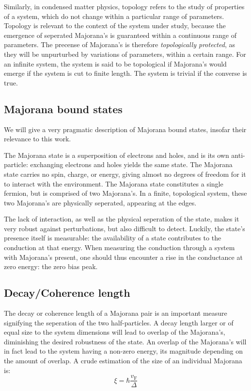 	Similarly, in condensed matter physics, topology refers to the study of properties of a system, which do not change within a particular range of parameters.
	Topology is relevant to the context of the system under study, because the emergence of seperated Majorana's is guaranteed within a continuous range of parameters.
	The precense of Majorana's is therefore \emph{topologically protected}, as they will be unpurturbed by variations of parameters, within a certain range.
	For an infinite system, the system is said to be topological if Majorana's would emerge if the system is cut to finite length.
	The system is trivial if the converse is true.

	\subsection{Majorana bound states}
		We will give a very pragmatic description of Majorana bound states, insofar their relevance to this work.

		The Majorana state is a superposition of electrons and holes, and is its own anti-particle: exchanging electrons and holes yields the same state.
		The Majorana state carries no spin, charge, or energy, giving almost no degrees of freedom for it to interact with the environment.
		The Majorana state constitutes a single fermion, but is comprised of two Majorana's.
		In a finite, topological system, these two Majorana's are physically seperated, appearing at the edges.

		The lack of interaction, as well as the physical seperation of the state, makes it very robust against perturbations, but also difficult to detect.
		Luckily, the state's presence itself is measurable: the availability of a state contributes to the conduction at that energy.
		When measuring the conduction through a system with Majorana's present, one should thus encounter a rise in the conductance at zero energy: the zero bias peak.

	\subsection{Decay/Coherence length}
		The decay or coherence length of a Majorana pair is an important measure signifying the seperation of the two half-particles.
		A decay length larger or of equal size to the system dimensions will lead to overlap of the Majorana's, diminishing the desired robustness of the state.
		An overlap of the Majorana's will in fact lead to the system having a non-zero energy, its magnitude depending on the amount of overlap.
		A crude estimation of the size of an individual Majorana is:
		\begin{equation}
			\xi = \hbar \frac{v_\text{F}}{\Delta}
		\end{equation}

